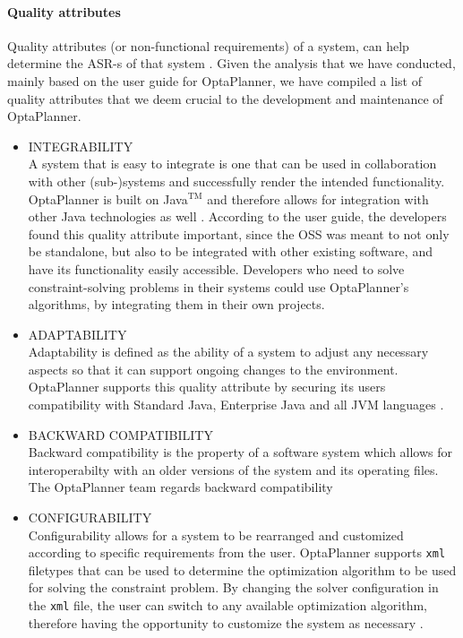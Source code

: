 \paragraph{Quality attributes}
Quality attributes (or non-functional requirements) of a system, can help determine the ASR-s of that system \cite{asrs}.
Given the analysis that we have conducted, mainly based on the user guide for OptaPlanner, we have compiled a list of quality attributes that we deem crucial to the development and maintenance of OptaPlanner.
\begin{itemize}
    \item {\scriptsize\MakeUppercase{Integrability}}\\
    A system that is easy to integrate is one that can be used in collaboration with other (sub-)systems and successfully render the intended functionality.
    OptaPlanner is built on Java$^{\text{TM}}$ and therefore allows for integration with other Java technologies as well \cite{userguide}. According to the user guide, the developers found this quality attribute important, since the OSS was meant to not only be standalone, but also to be integrated with other existing software, and have its functionality easily accessible. Developers who need to solve constraint-solving problems in their systems could use OptaPlanner's algorithms, by integrating them in their own projects.
    
    \item {\scriptsize\MakeUppercase{Adaptability}}\\ 
    Adaptability is defined as the ability of a system to adjust any necessary aspects so that it can support ongoing changes to the environment. OptaPlanner supports this quality attribute by securing its users compatibility with Standard Java, Enterprise Java and all JVM languages \cite{userguide}.
    
     \item {\scriptsize\MakeUppercase{Backward compatibility}}\\ 
    Backward compatibility is the property of a software system which allows for interoperabilty with an older versions of the system and its operating files. The OptaPlanner team regards backward compatibility 
    
    \item {\scriptsize\MakeUppercase{Configurability}}\\
    Configurability allows for a system to be rearranged and customized according to specific requirements from the user. 
    OptaPlanner supports \verb!xml! filetypes that can be used to determine the optimization algorithm to be used for solving the constraint problem. By changing the solver configuration in the \verb!xml! file, the user can switch to any available optimization algorithm, therefore having the opportunity to customize the system as necessary \cite{userguide}.
    

\end{itemize}
